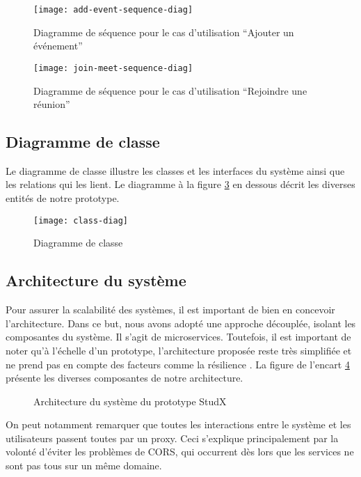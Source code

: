 \begin{figure}[H]
  \centering
  \texttt{[image: add-event-sequence-diag]}
  \caption{Diagramme de séquence pour le cas d’utilisation “Ajouter un événement”}
  \label{fig:add_event_seq_diag}
\end{figure}

\begin{figure}[H]
  \centering
  \texttt{[image: join-meet-sequence-diag]}
  \caption{Diagramme de séquence pour le cas d’utilisation “Rejoindre une réunion”}
  \label{fig:join_meet_seq_diag}
\end{figure}

\subsection{Diagramme de classe}
Le diagramme de classe illustre les classes et les interfaces du système ainsi que les relations qui les lient. 
Le diagramme à la figure \ref{fig:class_diag} en dessous décrit les diverses entités de notre prototype.

\begin{figure}[H]
  \centering
  \texttt{[image: class-diag]}
  \caption{Diagramme de classe}
  \label{fig:class_diag}
\end{figure}

\subsection{Architecture du système}
Pour assurer la scalabilité des systèmes, il est important de bien en concevoir l’architecture. 
Dans ce but, nous avons adopté une approche découplée, isolant les composantes du système. 
Il s’agit de microservices. Toutefois, il est important de noter qu'à l'échelle d’un prototype, 
l’architecture proposée reste très simplifiée et ne prend pas en compte des facteurs comme la résilience \cite{microservices_resiliency}. 
La figure de l'encart \ref{fig:system_design} présente les diverses composantes de notre architecture.


\begin{figure}[H]
  \centering
  \caption{Architecture du système du prototype StudX}
  \label{fig:system_design}
\end{figure}

On peut notamment remarquer que toutes les interactions entre le système et les utilisateurs passent toutes par un proxy. 
Ceci s’explique principalement par la volonté d'éviter les problèmes de CORS, 
qui occurrent dès lors que les services ne sont pas tous sur un même domaine.

